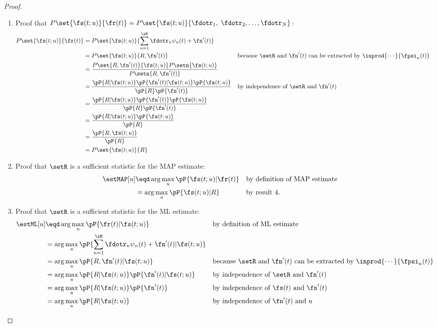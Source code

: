 \begin{proof}
\begin{enumerate}
\item Proof that $P\set{\fs(t;u)}{\fr(t)}=P\set{\fs(t;u)}{\fdotr_1,\;\fdotr_2,\ldots,\fdotr_N}$:
\begin{align*}
   P\set{\fs(t;u)}{\fr(t)}
     &= P\set{\fs(t;u)}{\sum_{n=1}^\xN\fdotr_n \psi_n(t) + \fn'(t)}
   \\&= P\set{\fs(t;u)}{R, \fn'(t)}
     && \text{because $\setR$ and $\fn'(t)$ can be extracted by $\inprod{\cdots}{\fpsi_n(t)}$}
   \\&= \frac{P\set{R, \fn'(t)}{\fs(t;u)}  P\setn{\fs(t;u)} }
             {P\setn{R,\fn'(t)}}
   \\&= \frac{\pP{ R|\fs(t;u)}\pP{ \fn'(t)|\fs(t;u)}\pP{\fs(t;u)}}
             {\pP{R}\pP{\fn'(t)}}
     && \text{by independence of $\setR$ and $\fn'(t)$}
   \\&= \frac{\pP{ R|\fs(t;u)}\pP{ \fn'(t)}\pP{\fs(t;u)}}
             {\pP{R}\pP{\fn'(t)}}
   \\&= \frac{\pP{ R|\fs(t;u)} \pP{\fs(t;u)}}
             {\pP{R}}
   \\&= \frac{\pP{ R,\fs(t;u)}}
             {\pP{R}}
   \\&= P\set{\fs(t;u)}{R}
\end{align*}

\item Proof that $\setR$ is a sufficient statistic for the MAP estimate:
\begin{align*}
   \estMAP[u]
     &\eqd \arg\max_u \pP{\fs(t;u)|\fr(t)}
     &&    \text{by definition of MAP estimate}
   \\&=    \arg\max_u \pP{\fs(t;u)|R}
     &&    \text{by result 4.}
\end{align*}

\item Proof that $\setR$ is a sufficient statistic for the ML estimate:
\begin{align*}
   \estML[u]
     &\eqd \arg\max_u \pP{\fr(t)|\fs(t;u)}
     &&    \text{by definition of ML estimate}
   \\&=    \arg\max_u \pP{\sum_{n=1}^\xN\fdotr_n\psi_n(t)+\fn'(t)|\fs(t;u)}
   \\&=    \arg\max_u \pP{R,\fn'(t)|\fs(t;u)}
     &&    \text{because $\setR$ and $\fn'(t)$ can be extracted by  $\inprod{\cdots}{\fpsi_n(t)}$}
   \\&=    \arg\max_u \pP{R|\fs(t;u)}\pP{\fn'(t)|\fs(t;u)}
     &&    \text{by independence of $\setR$ and $\fn'(t)$}
   \\&=    \arg\max_u \pP{R|\fs(t;u)}\pP{\fn'(t)}
     &&    \text{by independence of $\fs(t)$ and $\fn'(t)$}
   \\&=    \arg\max_u \pP{R|\fs(t;u)}
     &&    \text{by independence of $\fn'(t)$ and $u$}
\end{align*}
\end{enumerate}
\end{proof}


